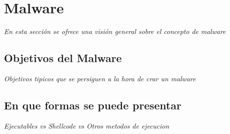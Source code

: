 \chapter{Malware}

\textit{En esta sección se ofrece una visión general sobre el concepto de malware}
\vspace{1em}

\section{Objetivos del Malware}

\textit{Objetivos tipicos que se persiguen a la hora de crar un malware}
\vspace{1em}

\section{En que formas se puede presentar}

\textit{Ejecutables vs Shellcode vs Otros metodos de ejecucion}
\vspace{1em}




